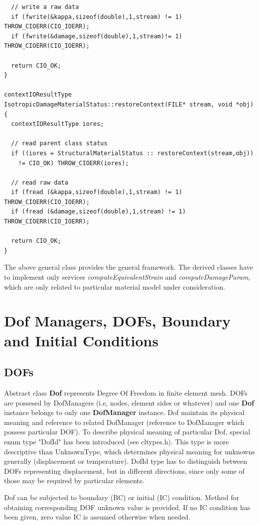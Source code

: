\documentclass[a4paper]{article}
\newcommand{\class}[1]{{\bf #1}}
\newcommand{\service}[1]{{\em #1}}
\begin{document}
{\begin{verbatim}
  // write a raw data
  if (fwrite(&kappa,sizeof(double),1,stream) != 1) THROW_CIOERR(CIO_IOERR);
  if (fwrite(&damage,sizeof(double),1,stream)!= 1) THROW_CIOERR(CIO_IOERR);

  return CIO_OK;
}

contextIOResultType
IsotropicDamageMaterialStatus::restoreContext(FILE* stream, void *obj)
{
  contextIOResultType iores;

  // read parent class status
  if ((iores = StructuralMaterialStatus :: restoreContext(stream,obj)) 
    != CIO_OK) THROW_CIOERR(iores);

  // read raw data 
  if (fread (&kappa,sizeof(double),1,stream) != 1) THROW_CIOERR(CIO_IOERR);
  if (fread (&damage,sizeof(double),1,stream) != 1) THROW_CIOERR(CIO_IOERR);

  return CIO_OK;
}

\end{verbatim}}

The above general class provides the general framework. The derived
classes have to implement only services
\service{computeEquivalentStrain} and \service{computeDamageParam},
which are only related to particular material model under consideration.

\section{Dof Managers, DOFs, Boundary and Initial Conditions}
\subsection{DOFs}
Abstract class \class{Dof} represents Degree Of Freedom in finite element mesh. 
DOFs are possesed by DofManagers (i.e, nodes, element sides or whatever) and 
one \class{Dof} instance  belongs to only one \class{DofManager} instance.
Dof maintain its physical meaning and reference to
related DofManager (reference to DofManager which possess particular DOF).
To describe physical meaning of particular Dof, special enum type "DofId" has
been introduced (see cltypes.h). This type is more descriptive than 
UnknownType, which determines physical meaning for unknowns generally 
(displacement or temperature). DofId type has to distinguish between 
DOFs representing displacement, but in different directions, since
only some of those may be required by particular elements.

Dof can be subjected to boundary (BC) or initial (IC) condition. Method for 
obtaining corresponding DOF unknown value is provided. If no IC condition 
has been given, zero value IC is assumed otherwise when needed.
\end{document}

